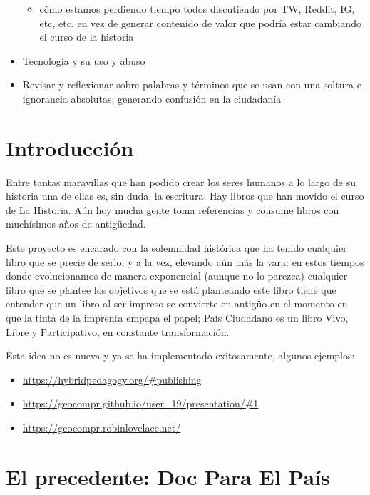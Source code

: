 \documentclass[
]{book}
\providecommand{\tightlist}{%
  \setlength{\itemsep}{0pt}\setlength{\parskip}{0pt}}
\begin{document}
\begin{itemize}
  \begin{itemize}
  \tightlist
  \item
    cómo estamos perdiendo tiempo todos discutiendo por TW, Reddit, IG, etc, etc, en vez de generar contenido de valor que podría estar cambiando el curso de la historia
  \end{itemize}
\item
  Tecnología y su uso y abuso
\item
  Revisar y reflexionar sobre palabras y términos que se usan con una soltura e ignorancia absolutas, generando confusión en la ciudadanía
\end{itemize}

\hypertarget{intro}{%
\chapter{Introducción}\label{intro}}

Entre tantas maravillas que han podido crear los seres humanos a lo largo de su historia una de ellas es, sin duda, la escritura. Hay libros que han movido el curso de La Historia. Aún hoy mucha gente toma referencias y consume libros con muchísimos años de antigüedad.

Este proyecto es encarado con la solemnidad histórica que ha tenido cualquier libro que se precie de serlo, y a la vez, elevando aún más la vara: en estos tiempos donde evolucionamos de manera exponencial (aunque no lo parezca) cualquier libro que se plantee los objetivos que se está planteando este libro tiene que entender que un libro al ser impreso se convierte en antigüo en el momento en que la tinta de la imprenta empapa el papel; País Ciudadano es un libro Vivo, Libre y Participativo, en constante transformación.

Esta idea no es nueva y ya se ha implementado exitosamente, algunos ejemplos:

\begin{itemize}
\tightlist
\item
  \url{https://hybridpedagogy.org/\#publishing}
\item
  \url{https://geocompr.github.io/user_19/presentation/\#1}
\item
  \url{https://geocompr.robinlovelace.net/}
\end{itemize}

\hypertarget{el-precedente-doc-para-el-pauxeds}{%
\chapter{El precedente: Doc Para El País}\label{el-precedente-doc-para-el-pauxeds}}
\end{document}
